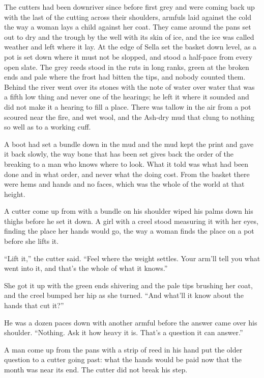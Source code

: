 The cutters had been downriver since before first grey and were coming back up with the last of the cutting across their shoulders, armfuls laid against the cold the way a woman lays a child against her coat. They came around the pans set out to dry and the trough by the well with its skin of ice, and the ice was called weather and left where it lay. At the edge of  Sella set the basket down level, as a pot is set down where it must not be slopped, and stood a half-pace from every open slate. The grey reeds stood in the ruts in long ranks, green at the broken ends and pale where the frost had bitten the tips, and nobody counted them. Behind  the river went over its stones with the note of water over water that was a fifth low thing and never one of the hearings; he left it where it sounded and did not make it a hearing to fill a place. There was tallow in the air from a pot scoured near the fire, and wet wool, and the Ash-dry mud that clung to nothing so well as to a working cuff.

A boot had set a bundle down in the mud and the mud kept the print and gave it back slowly, the way bone that has been set gives back the order of the breaking to a man who knows where to look. What it told was what had been done and in what order, and never what the doing cost. From the basket there were hems and hands and no faces, which was the whole of the world at that height.

A cutter come up from  with a bundle on his shoulder wiped his palms down his thighs before he set it down. A girl with a creel stood measuring it with her eyes, finding the place her hands would go, the way a woman finds the place on a pot before she lifts it.

“Lift it,” the cutter said. “Feel where the weight settles. Your arm’ll tell you what went into it, and that’s the whole of what it knows.”

She got it up with the green ends shivering and the pale tips brushing her coat, and the creel bumped her hip as she turned. “And what’ll it know about the hands that cut it?”

He was a dozen paces down with another armful before the answer came over his shoulder. “Nothing. Ask it how heavy it is. That’s a question it can answer.”

A man come up from the pans with a strip of reed in his hand put the older question to a cutter going past: what the hands would be paid now that the month was near its end. The cutter did not break his step.

